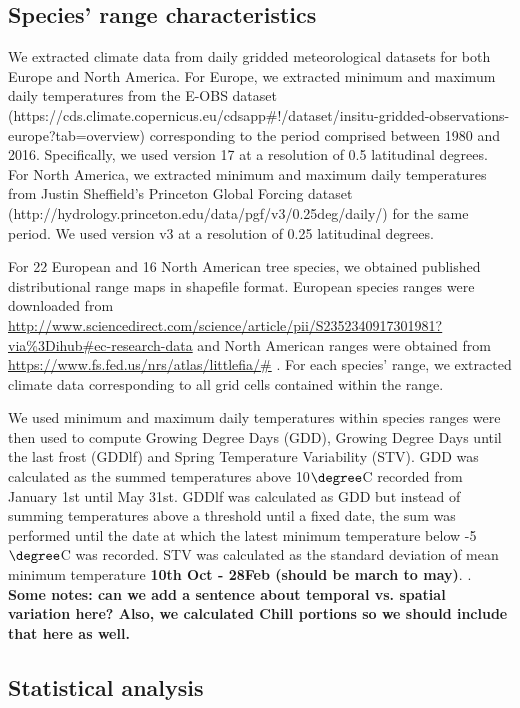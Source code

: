 \documentclass[12pt]{article}\usepackage[]{graphicx}\usepackage[]{color}
\begin{document}
\subsection*{Species' range characteristics}

We extracted climate data  from daily gridded meteorological datasets for both Europe and North America. For Europe, we extracted minimum and maximum daily temperatures from the E-OBS dataset (https://cds.climate.copernicus.eu/cdsapp#!/dataset/insitu-gridded-observations-europe?tab=overview) corresponding to the period comprised between 1980 and 2016. Specifically, we used version 17 at a resolution of 0.5 latitudinal degrees. For North America, we extracted minimum and maximum daily temperatures from Justin Sheffield’s Princeton Global Forcing dataset (http://hydrology.princeton.edu/data/pgf/v3/0.25deg/daily/) for the same period. We used version v3 at a resolution of 0.25 latitudinal degrees. 

For 22 European and 16 North American tree species, we obtained published distributional range maps in shapefile format. European species ranges were downloaded from \url{http://www.sciencedirect.com/science/article/pii/S2352340917301981?via\%3Dihub#ec-research-data} \citep{Caudullo2017} and North American ranges were obtained from \url{https://www.fs.fed.us/nrs/atlas/littlefia/#} \citep{Prasad2003}. For each species' range, we extracted climate data corresponding to all grid cells contained within the range.

We used minimum and maximum daily temperatures within species ranges were then used to compute Growing Degree Days (GDD), Growing Degree Days until the last frost (GDDlf) and Spring Temperature Variability (STV). GDD was calculated as the summed temperatures above 10$\degree$C recorded from January 1st until May 31st. GDDlf was calculated as GDD but instead of summing temperatures above a threshold until a fixed date, the sum was performed until the date at which the latest minimum temperature below -5$\degree$C was recorded. STV was calculated as the standard deviation of mean minimum temperature  \textbf{10th Oct - 28Feb (should be march to may)}. \citep{Zohner:2017aa}.  \textbf{Some notes: can we add a sentence about temporal vs. spatial variation here? Also, we calculated Chill portions so we should include that here as well.}

\subsection*{Statistical analysis}
\end{document}
